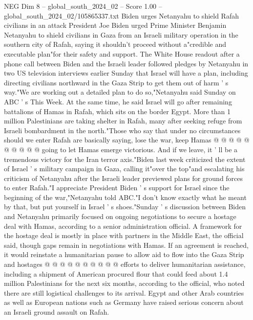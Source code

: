 \begin{textsample}{NEG Dim 8 – global\_south\_2024\_02 – Score 1.00 – global\_south\_2024\_02/105865337.txt}  \label{ex:f8_neg_253}
Biden urges Netanyahu to shield Rafah civilians in an attack President Joe Biden urged Prime Minister Benjamin Netanyahu to shield civilians in Gaza from an Israeli military operation in the southern city of Rafah, saying it shouldn't proceed without a"credible and executable plan"for their safety and support.
The White House readout after a phone call between Biden and the Israeli leader followed pledges by Netanyahu in two US television interviews earlier Sunday that Israel will have a plan, including directing civilians northward in the Gaza Strip to get them out of harm ' s way."We are working out a detailed plan to do so,"Netanyahu said Sunday on ABC ' s This Week.
At the same time, he said Israel will go after remaining battalions of Hamas in Rafah, which sits on the border Egypt.
More than 1 million Palestinians are taking shelter in Rafah, many after seeking refuge from Israeli bombardment in the north."Those who say that under no circumstances should we enter Rafah are basically saying, lose the war, keep Hamas @ @ @ @ @ @ @ @ @ @ going to let Hamas emerge victorious.
And if we leave, it ' ll be a tremendous victory for the Iran terror axis."Biden last week criticized the extent of Israel ' s military campaign in Gaza, calling it"over the top"and escalating his criticism of Netanyahu after the Israeli leader previewed plans for ground forces to enter Rafah."I appreciate President Biden ' s support for Israel since the beginning of the war,"Netanyahu told ABC."I don't know exactly what he meant by that, but put yourself in Israel ' s shoes."Sunday ' s discussion between Biden and Netanyahu primarily focused on ongoing negotiations to secure a hostage deal with Hamas, according to a senior administration official.
A framework for the hostage deal is mostly in place with partners in the Middle East, the official said, though gaps remain in negotiations with Hamas.
If an agreement is reached, it would reinstate a humanitarian pause to allow aid to flow into the Gaza Strip and hostages @ @ @ @ @ @ @ @ @ @ efforts to deliver humanitarian assistance, including a shipment of American procured flour that could feed about 1.4 million Palestinians for the next six months, according to the official, who noted there are still logistical challenges to its arrival.
Egypt and other Arab countries as well as European nations such as Germany have raised serious concern about an Israeli ground assault on Rafah.

\end{textsample}
